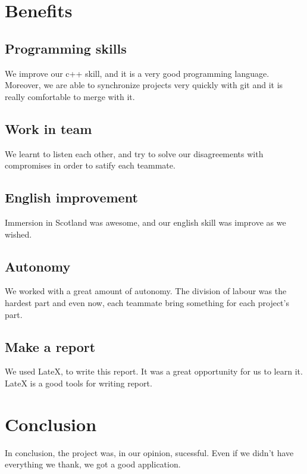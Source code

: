 \documentclass{scrreprt}
\begin{document}
					\chapter{Benefits}
					\section{Programming skills}
					We improve our c++ skill,  and it is a very good programming language.
					Moreover, we are able to synchronize projects very quickly with git and it is really comfortable to merge with it.
					\section{Work in team}
					We learnt to listen each other, and try to solve our disagreements with compromises in order to satify each teammate.
					\section{English improvement}
					Immersion in Scotland was awesome, and our english skill was improve as we wished.
					\section{Autonomy}
					We worked with a great amount of autonomy. The division of labour was the hardest part and even now, each teammate bring something for each project's part.
					\section{Make a report}
					We used LateX, to write this report. It was a great opportunity for us to learn it. LateX is a good tools for writing report.

					\chapter*{Conclusion} %
					In conclusion, the project was, in our opinion, sucessful. Even if we didn't have everything we thank, we got a good application. 
					
\end{document}
